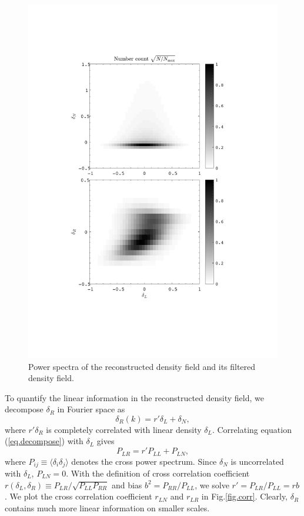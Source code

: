\documentclass[aps,prd,twocolumn,superscriptaddress,amsfont,amssymb,amsmath,nofootinbib,showpacs,balancelastpage]{revtex4-1}
\begin{document}
\begin{figure}[t] \centering
  \includegraphics[width=1.0\linewidth]{pdfs.pdf}
  \caption{Power spectra of the reconstructed density field and its
  filtered density field.}
  \label{fig.pdfs}
\end{figure}

To quantify the linear information in the reconstructed density field, we decompose $\delta_R$ in Fourier space as
\begin{equation}\label{eq.decompose}
    \delta_R(k)=r'\delta_L+\delta_N,
\end{equation}
where $r'\delta_R$ is completely correlated with linear density $\delta_L$. Correlating equation (\ref{eq.decompose}) with $\delta_L$ gives
\begin{equation}
    P_{LR}=r'P_{LL}+P_{LN},
\end{equation}
where $P_{ij}\equiv\langle\delta_i\delta_j\rangle$ denotes the cross power 
spectrum. Since $\delta_N$ is uncorrelated with $\delta_L$, $P_{LN}=0$. With the 
definition of cross correlation coefficient $r(\delta_L,\delta_R)\equiv P_{LR}/\sqrt{P_{LL}P_{RR}}$ 
and bias $b^2=P_{RR}/P_{LL}$, we solve $r'=P_{LR}/P_{LL}=rb$. We plot the cross 
correlation coefficient $r_{LN}$ and $r_{LR}$ in Fig.\ref{fig.corr}. Clearly, $
\delta_R$ contains much more linear information on smaller scales.
\end{document}
